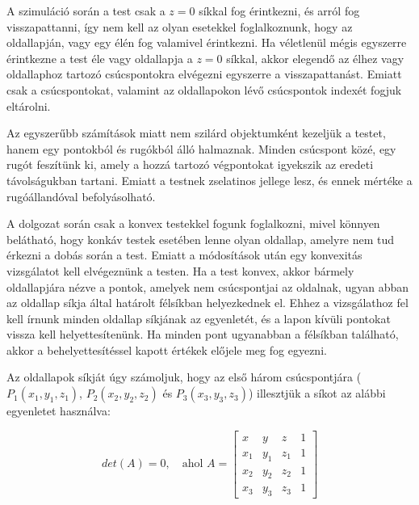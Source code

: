 

A szimuláció során a test csak a $z=0$ síkkal fog érintkezni, és arról fog visszapattanni, így nem kell az olyan esetekkel foglalkoznunk, hogy az oldallapján, vagy egy élén fog valamivel érintkezni.
Ha véletlenül mégis egyszerre érintkezne a test éle vagy oldallapja a $z=0$ síkkal, akkor elegendő az élhez vagy oldallaphoz tartozó csúcspontokra elvégezni egyszerre a visszapattanást.
Emiatt csak a csúcspontokat, valamint az oldallapokon lévő csúcspontok indexét fogjuk eltárolni.

Az egyszerűbb számítások miatt nem szilárd objektumként kezeljük a testet, 	hanem egy pontokból és rugókból álló halmaznak.
Minden csúcspont közé, egy rugót feszítünk ki, amely a hozzá tartozó végpontokat igyekszik az eredeti távolságukban tartani.
Emiatt a testnek zselatinos jellege lesz, és ennek mértéke a rugóállandóval befolyásolható.

A dolgozat során csak a konvex testekkel fogunk foglalkozni, mivel könnyen belátható, hogy konkáv testek esetében lenne olyan oldallap, amelyre nem tud érkezni a dobás során a test.
Emiatt a módosítások után egy konvexitás vizsgálatot kell elvégeznünk a testen.
Ha a test konvex, akkor bármely oldallapjára nézve a pontok, amelyek nem csúcspontjai az oldalnak, ugyan abban az oldallap síkja által határolt félsíkban helyezkednek el.
Ehhez a vizsgálathoz fel kell írnunk minden oldallap síkjának az egyenletét, és a lapon kívüli pontokat vissza kell helyettesítenünk.
Ha minden pont ugyanabban a félsíkban található, akkor a behelyettesítéssel kapott értékek előjele meg fog egyezni.

Az oldallapok síkját úgy számoljuk, hogy az első három csúcspontjára ($P_1(x_1, y_1, z_1)$, $P_2(x_2, y_2, z_2)$ és $P_3(x_3, y_3, z_3)$) illesztjük a síkot az alábbi egyenletet használva:

\[
det(A)=0,\quad \text{ahol } A = 
\begin{bmatrix}
	x & y & z & 1 \\
	x_1 & y_1 & z_1 & 1 \\
	x_2 & y_2 & z_2 & 1 \\
	x_3 & y_3 & z_3 & 1
\end{bmatrix}
\]
\newpage

